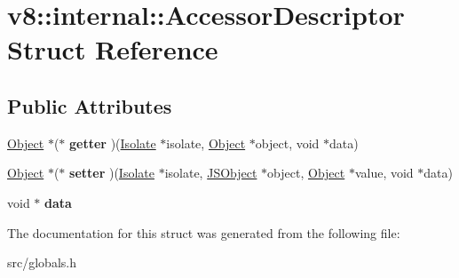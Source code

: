 \hypertarget{structv8_1_1internal_1_1_accessor_descriptor}{}\section{v8\+:\+:internal\+:\+:Accessor\+Descriptor Struct Reference}
\label{structv8_1_1internal_1_1_accessor_descriptor}
\subsection*{Public Attributes}
\begin{DoxyCompactItemize}
\item 
\hypertarget{structv8_1_1internal_1_1_accessor_descriptor_a0fd4975f95e4accee711fe7144fcd91c}{}\hyperlink{classv8_1_1internal_1_1_object}{Object} $\ast$($\ast$ {\bfseries getter} )(\hyperlink{classv8_1_1internal_1_1_isolate}{Isolate} $\ast$isolate, \hyperlink{classv8_1_1internal_1_1_object}{Object} $\ast$object, void $\ast$data)\label{structv8_1_1internal_1_1_accessor_descriptor_a0fd4975f95e4accee711fe7144fcd91c}

\item 
\hypertarget{structv8_1_1internal_1_1_accessor_descriptor_abe99f0b12d8048825a324b575b837dca}{}\hyperlink{classv8_1_1internal_1_1_object}{Object} $\ast$($\ast$ {\bfseries setter} )(\hyperlink{classv8_1_1internal_1_1_isolate}{Isolate} $\ast$isolate, \hyperlink{classv8_1_1internal_1_1_j_s_object}{J\+S\+Object} $\ast$object, \hyperlink{classv8_1_1internal_1_1_object}{Object} $\ast$value, void $\ast$data)\label{structv8_1_1internal_1_1_accessor_descriptor_abe99f0b12d8048825a324b575b837dca}

\item 
\hypertarget{structv8_1_1internal_1_1_accessor_descriptor_acc4fa03840c10eea3f97798ea0cfc632}{}void $\ast$ {\bfseries data}\label{structv8_1_1internal_1_1_accessor_descriptor_acc4fa03840c10eea3f97798ea0cfc632}

\end{DoxyCompactItemize}


The documentation for this struct was generated from the following file\+:\begin{DoxyCompactItemize}
\item 
src/globals.\+h\end{DoxyCompactItemize}
